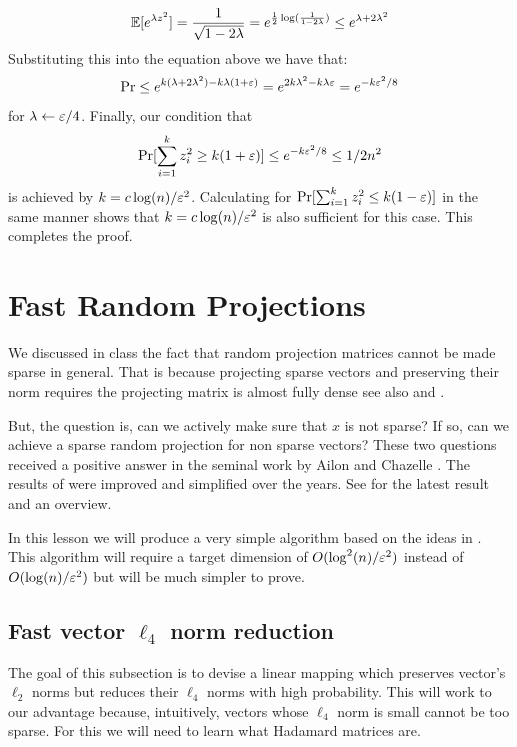 \documentclass{article}
\begin{document}
\[
{\mathbb E} [e^{\lambda z^{2}}] = \frac{1}{\sqrt{1-2\lambda}} = e^{\frac{1}{2} \log(\frac{1}{1-2\lambda})} \le e^{\lambda + 2\lambda^2}
\]
Substituting this into the equation above we have that:
\[
\Pr \le e^{k(\lambda  + 2\lambda^2) - k\lambda (1+\varepsilon)} = e^{ 2k\lambda^2 - k\lambda\varepsilon}  = e^{ - k\varepsilon^2/8}  
\]
for $\lambda \leftarrow \varepsilon/4$. Finally, our condition that 
\[
\Pr[\sum_{i=1}^{k} z^{2}_{i} \ge k(1+\varepsilon)] \le e^{ - k\varepsilon^2/8} \le 1/2n^2
\]
is achieved by $k = c\log(n)/\varepsilon^2$.
Calculating for $\Pr[\sum_{i=1}^{k} z^{2}_{i} \le k(1-\varepsilon)]$ in the same manner shows that $k = c\log(n)/\varepsilon^2$ is also sufficient for this case.
This completes the proof.





\section{Fast Random Projections}
We discussed in class the fact that random projection matrices cannot be made sparse in general.
That is because projecting sparse vectors and preserving their norm requires the projecting matrix is almost fully dense see also \cite{JelaniH2012} and \cite{KaneN12}.

But, the question is, can we actively make sure that $x$ is not sparse? If so, can we achieve a sparse random projection for non sparse vectors?
These two questions received a positive answer in the seminal work by Ailon and Chazelle \cite{AilonCh06}.
The results of \cite{AilonCh06} were improved and simplified over the years. See \cite{AilonL11} for the latest result and an overview.

In this lesson we will produce a very simple algorithm based on the ideas in \cite{AilonCh06}.
This algorithm will require a target dimension of $O(\log^2(n)/\varepsilon^2)$ instead of $O(\log(n)/\varepsilon^2)$ but will be much simpler to prove.

\subsection{Fast vector $\ell_4$ norm reduction}
The goal of this subsection is to devise a linear mapping which preserves vector's $\ell_2$ norms but reduces their $\ell_4$ norms with high probability.
This will work to our advantage because, intuitively, vectors whose $\ell_4$ norm is small cannot be too sparse.
For this we will need to learn what Hadamard matrices are.
\end{document}
